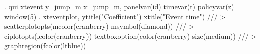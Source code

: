 . qui xtevent y_jump_m x_jump_m, panelvar(id) timevar(t) policyvar(z) window(5) 
{\smallskip}
. xteventplot, ytitle("Coefficient") xtitle("Event time") ///
> scatterplotopts(mcolor(cranberry) msymbol(diamond)) ///
> ciplotopts(lcolor(cranberry)) textboxoption(color(cranberry) size(medium)) ///
> graphregion(fcolor(ltblue))
